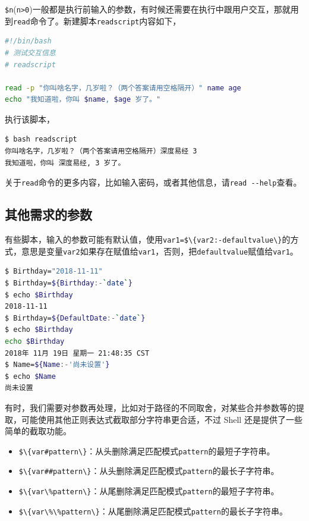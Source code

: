 \documentclass[doctor,openright,twoside]{sjtuthesis}
\providecommand{\tightlist}{%
    \setlength{\itemsep}{0pt}\setlength{\parskip}{0pt}}
\newcommand{\passthrough}[1]{#1}
\theoremstyle{plain}
\theoremstyle{definition}
\theoremstyle{remark}
\theoremstyle{ocrenumbox}
\theoremstyle{plain}
\begin{document}
\passthrough{\lstinline!$n!}(\passthrough{\lstinline!n>0!})一般都是执行前输入的参数，有时候还需要在执行中跟用户交互，那就用到\passthrough{\lstinline!read!}命令了。新建脚本\passthrough{\lstinline!readscript!}内容如下，

\begin{lstlisting}[language=bash]
#!/bin/bash
# 测试交互信息
# readscript

read -p "你叫啥名字，几岁啦？（两个答案请用空格隔开）" name age
echo "我知道啦，你叫 $name, $age 岁了。"
\end{lstlisting}

执行该脚本，

\begin{lstlisting}[language=bash]
$ bash readscript 
你叫啥名字，几岁啦？（两个答案请用空格隔开）深度易经 3
我知道啦，你叫 深度易经, 3 岁了。
\end{lstlisting}

关于\passthrough{\lstinline!read!}命令的更多内容，比如输入密码，或者其他信息，请\passthrough{\lstinline!read --help!}查看。

\subsection{其他需求的参数}

有些脚本，输入的参数可能有默认值，使用\passthrough{\lstinline!var1=$\{var2:-defaultvalue\}!}的方式，意思是变量\passthrough{\lstinline!var2!}如果存在赋值给\passthrough{\lstinline!var1!}，否则，把\passthrough{\lstinline!defaultvalue!}赋值给\passthrough{\lstinline!var1!}。

\begin{lstlisting}[language=bash]
$ Birthday="2018-11-11"
$ Birthday=${Birthday:-`date`}
$ echo $Birthday
2018-11-11
$ Birthday=${DefaultDate:-`date`}
$ echo $Birthday
echo $Birthday 
2018年 11月 19日 星期一 21:48:35 CST
$ Name=${Name:-'尚未设置'}
$ echo $Name
尚未设置
\end{lstlisting}

有时，我们需要对参数再处理，比如对于路径的不同取舍，对某些合并参数等的提取，可能使用其他正则表达式截取部分字符串更合适，不过
Shell 还是提供了一些简单的截取功能。

\begin{itemize}
\tightlist
\item
  \passthrough{\lstinline!$\{var#pattern\}!}：从头删除满足匹配模式\passthrough{\lstinline!pattern!}的最短子字符串。
\item
  \passthrough{\lstinline!$\{var##pattern\}!}：从头删除满足匹配模式\passthrough{\lstinline!pattern!}的最长子字符串。
\item
  \passthrough{\lstinline!$\{var\%pattern\}!}：从尾删除满足匹配模式\passthrough{\lstinline!pattern!}的最短子字符串。
\item
  \passthrough{\lstinline!$\{var\%\%pattern\}!}：从尾删除满足匹配模式\passthrough{\lstinline!pattern!}的最长子字符串。
\end{itemize}
\end{document}
